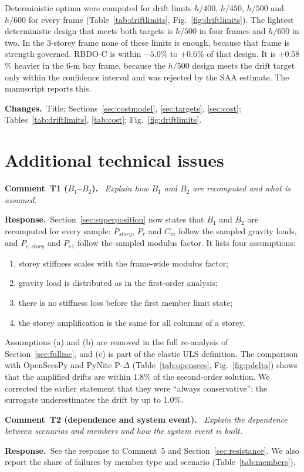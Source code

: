 \documentclass[11pt]{article}
\newcounter{rc}
\newenvironment{comment}[1]{\refstepcounter{rc}\par\medskip\noindent\textbf{Comment~#1.}\ \itshape}{\par}
\newcommand{\resp}{\par\noindent\textbf{Response.}\ }
\newcommand{\chg}{\par\noindent\textbf{Changes.}\ }
\begin{document}
Deterministic optima were computed for drift limits $h/400$, $h/450$, $h/500$ and $h/600$ for every
frame (Table~\ref{tab:driftlimits}, Fig.~\ref{fig:driftlimits}). The lightest deterministic design
that meets both targets is $h/500$ in four frames and $h/600$ in two. In the 3-storey frame none of
these limits is enough, because that frame is strength-governed. RBDO-C is within $-5.0$\% to $+0.6$\%
of that design. It is $+0.58$\% heavier in the 6-m bay frame, because the $h/500$ design meets the
drift target only within the confidence interval and was rejected by the SAA estimate. The
manuscript reports this.
\chg Title; Sections~\ref{sec:costmodel}, \ref{sec:targets}, \ref{sec:cost};
Tables~\ref{tab:driftlimits}, \ref{tab:cost}; Fig.~\ref{fig:driftlimits}.

\section*{Additional technical issues}

\begin{comment}{T1 ($B_1$--$B_2$)}
Explain how $B_1$ and $B_2$ are recomputed and what is assumed.
\end{comment}
\resp Section~\ref{sec:superposition} now states that $B_1$ and $B_2$ are recomputed for every sample:
$P_{story}$, $P_r$ and $C_m$ follow the sampled gravity loads, and $P_{e,story}$ and $P_{e1}$ follow the
sampled modulus factor. It lists four assumptions:
\begin{enumerate}[label=(\alph*),itemsep=0.1em]
\item storey stiffness scales with the frame-wide modulus factor;
\item gravity load is distributed as in the first-order analysis;
\item there is no stiffness loss before the first member limit state;
\item the storey amplification is the same for all columns of a storey.
\end{enumerate}
Assumptions (a) and (b) are removed in the full re-analysis of Section~\ref{sec:fullmc}, and (c) is
part of the elastic ULS definition. The comparison with OpenSeesPy and PyNite P-$\Delta$
(Table~\ref{tab:opensees}, Fig.~\ref{fig:pdelta}) shows that the amplified drifts are within 1.8\% of
the second-order solution. We corrected the earlier statement that they were ``always conservative'':
the surrogate underestimates the drift by up to 1.0\%.

\begin{comment}{T2 (dependence and system event)}
Explain the dependence between scenarios and members and how the system event is built.
\end{comment}
\resp See the response to Comment~5 and Section~\ref{sec:resistance}. We also report the share of
failures by member type and scenario (Table~\ref{tab:members}).
\end{document}
